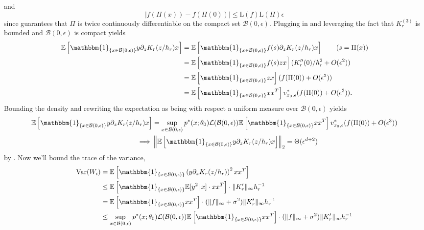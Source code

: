 \documentclass[11pt]{article}
\begin{document}
and
\[\left|f(\Pi(x)) - f(\Pi(0))\right| \leq \text{L}(f)\text{L}(\Pi)\epsilon\]
since  guarantees that $\Pi$ is twice continuously differentiable on the compact set $\mathcal{B}(0, \epsilon)$. Plugging in and leveraging the fact that $K^{(3)}_r$ is bounded and $\mathcal{B}(0, \epsilon)$ is compact yields
\begin{align*}
    \mathbb{E}\left[\mathbbm{1}_{\{x \in \mathcal{B}(0, \epsilon)\}}y\partial_{z}K_r(z/h_r)x\right] &= \mathbb{E}\left[\mathbbm{1}_{\{x \in \mathcal{B}(0, \epsilon)\}}f(s)\partial_{z}K_r(z/h_r)x\right] \tag{$s = \Pi(x)$} \\
    &= \mathbb{E}\left[\mathbbm{1}_{\{x \in \mathcal{B}(0, \epsilon)\}}f(s)zx\right](K''_r(0)/h_r^2 + O(\epsilon^2)) \\
    &= \mathbb{E}\left[\mathbbm{1}_{\{x \in \mathcal{B}(0, \epsilon)\}}zx\right](f(\Pi(0)) + O(\epsilon^3)) \\
    &= \mathbb{E}\left[\mathbbm{1}_{\{x \in \mathcal{B}(0, \epsilon)\}}xx^T\right]v^*_{x_0, \epsilon}(f(\Pi(0)) + O(\epsilon^3)).
\end{align*}
Bounding the density and rewriting the expectation as being with respect a uniform measure over $\mathcal{B}(0, \epsilon)$ yields
\begin{align*}
    \mathbb{E}\left[\mathbbm{1}_{\{x \in \mathcal{B}(0, \epsilon)\}}y\partial_{z}K_r(z/h_r)x\right] &= \sup_{x\in \mathcal{B}(0, \epsilon)}p^*(x; \theta_0)\mathcal{L}(\mathcal{B}(0, \epsilon))\mathbb{E}\left[\mathbbm{1}_{\{x \in \mathcal{B}(0, \epsilon)\}}xx^T\right]v^*_{x_0, \epsilon}(f(\Pi(0)) + O(\epsilon^3)) \\
    \implies &\left\|\mathbb{E}\left[\mathbbm{1}_{\{x \in \mathcal{B}(0, \epsilon)\}}y\partial_{z}K_r(z/h_r)x\right]\right\|_2 = \Theta(\epsilon^{d+2})
\end{align*}
by . Now we'll bound the trace of the variance,
\begin{align*}
    \text{Var}(W_i) &= \mathbb{E}\left[\mathbbm{1}_{\{x \in \mathcal{B}(0, \epsilon)\}}\left(y\partial_{z}K_r(z/h_r)\right)^2xx^T\right] \\
    &\leq \mathbb{E}\left[\mathbbm{1}_{\{x \in \mathcal{B}(0, \epsilon)\}}\mathbb{E}[y^2|\,x]\cdot xx^T\right] \cdot \|K_r'\|_{\infty}h_r^{-1}\\
    &= \mathbb{E}\left[\mathbbm{1}_{\{x \in \mathcal{B}(0, \epsilon)\}} xx^T\right] \cdot (\|f\|_{\infty} + \sigma^2)\|K_r'\|_{\infty}h_r^{-1} \\
    &\leq \sup_{x \in \mathcal{B}(0, \epsilon)}p^*(x; \theta_0) \mathcal{L}(\mathcal{B}(0, \epsilon))\mathbb{E}\left[\mathbbm{1}_{\{x \in \mathcal{B}(0, \epsilon)\}} xx^T\right] \cdot (\|f\|_{\infty} + \sigma^2)\|K_r'\|_{\infty}h_r^{-1}
\end{align*}
\end{document}
